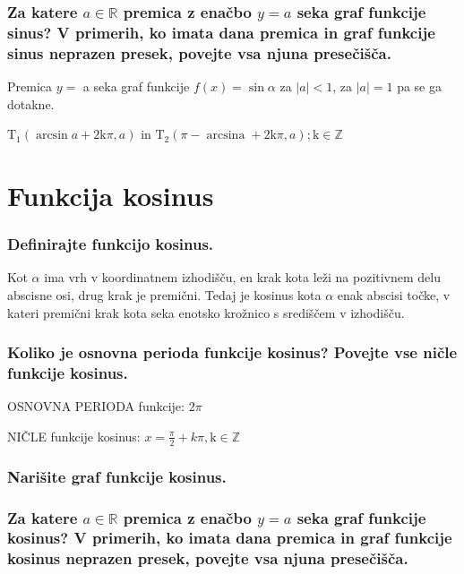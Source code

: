 \documentclass{article}
\begin{document}
\subsubsection*{Za katere $a \in \mathbb{R}$ premica z enačbo $y=a$ seka graf funkcije sinus? V primerih, ko imata dana premica in graf funkcije sinus neprazen presek, povejte vsa njuna presečišča.}

Premica $y=$ a seka graf funkcije $f(x)=\sin \alpha$ za $|a|<1$, za $|a|=1$ pa se ga dotakne.

$\mathrm{T}_{1}(\arcsin a+2 \mathrm{k} \pi, a)$ in $\mathrm{T}_{2}(\pi-\operatorname{arcsina}+2 \mathrm{k} \pi, a) ; \mathrm{k} \in \mathbb{Z}$

\section{Funkcija kosinus}
\subsubsection*{Definirajte funkcijo kosinus.}

Kot $\alpha$ ima vrh v koordinatnem izhodišču, en krak kota leži na pozitivnem delu abscisne osi, drug krak je premični. Tedaj je kosinus kota $\alpha$ enak abscisi točke, v kateri premični krak kota seka enotsko krožnico s središčem v izhodišču.

\subsubsection*{Koliko je osnovna perioda funkcije kosinus? Povejte vse ničle funkcije kosinus.}

OSNOVNA PERIODA funkcije: $2 \pi$

NIČLE funkcije kosinus: $x=\frac{\pi}{2}+k \pi, \mathrm{k} \in \mathbb{Z}$

\subsubsection*{Narišite graf funkcije kosinus.}


\subsubsection*{Za katere $a \in \mathbb{R}$ premica z enačbo $y=a$ seka graf funkcije kosinus? V primerih, ko imata dana premica in graf funkcije kosinus neprazen presek, povejte vsa njuna presečišča.}
\end{document}
